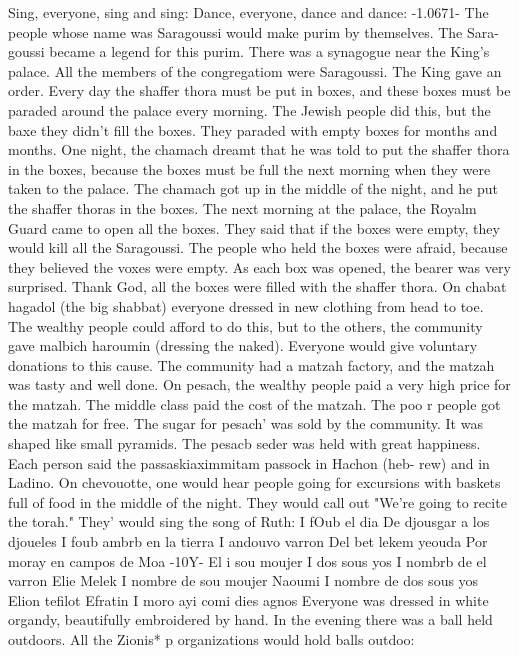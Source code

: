 {{Sing, everyone, sing and sing: 
Dance, everyone, dance and dance: 
-1.0671- 
The people whose name was Saragoussi would make purim by themselves. The Sara-
goussi became a legend for this purim. There was a synagogue near the King's palace. 
All the members of the congregatiom were Saragoussi. The King gave an order. Every 
day the shaffer thora must be put in boxes, and these boxes must be paraded around the 
palace every morning. The Jewish people did this, but the baxe they didn't fill the 
boxes. They paraded with empty boxes for months and months. One night, the chamach dreamt 
that he was told to put the shaffer thora in the boxes, because the boxes must be full 
the next morning when they were taken to the palace. The chamach got up in the middle of 
the night, and he put the shaffer thoras in the boxes. 
The next morning at the palace, the Royalm Guard came to open all the boxes. They 
said that if the boxes were empty, they would kill all the Saragoussi. The people who 
held the boxes were afraid, because they believed the voxes were empty. As each box 
was opened, the bearer was very surprised. Thank God, all the boxes were filled with the 
shaffer thora. 
On chabat hagadol (the big shabbat) everyone dressed in new clothing from head to 
toe. The wealthy people could afford to do this, but to the others, the community gave 
malbich haroumin (dressing the naked). Everyone would give voluntary donations to this 
cause. 
The community had a matzah factory, and the matzah was tasty and well done. On 
pesach, the wealthy people paid a very high price for the matzah. The middle class paid 
the cost of the matzah. The poo r people got the matzah for free. The sugar for pesach' 
was sold by the community. It was shaped like small pyramids. The pesacb seder was 
held with great happiness. Each person said the passaskiaximmitam passock in Hachon (heb-
rew) and in Ladino. 
On chevouotte, one would hear people going for excursions with baskets full of food 
in the middle of the night. They would call out "We're going to recite the torah." They' 
would sing the song of Ruth: 
I fOub el dia 
De djousgar a los djoueles 
I foub ambrb en la tierra 
I andouvo varron 
Del bet lekem yeouda 
Por moray en campos de Moa 
-10Y-
El i sou moujer 
I dos sous yos 
I nombrb de el varron Elie Melek 
I nombre de sou moujer Naoumi 
I nombre de dos sous yos 
Elion tefilot Efratin 
I moro ayi comi dies agnos 
Everyone was dressed in white organdy, beautifully embroidered by hand. In the evening 
there was a ball held outdoors. All the Zionis* p organizations would hold balls outdoo: 
}}
